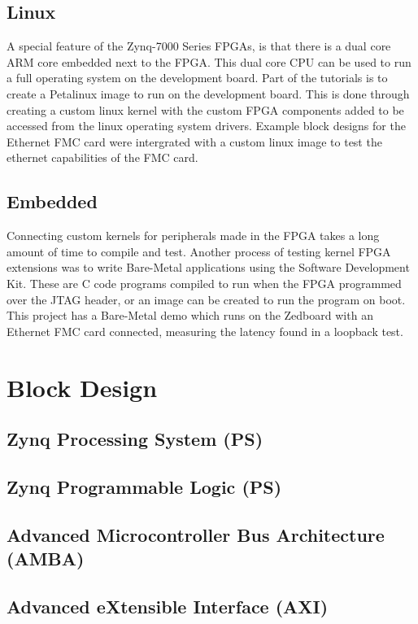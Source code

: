 \subsection{Linux}

\par A special feature of the Zynq-7000 Series FPGAs, is that there is a dual core ARM core embedded next to the FPGA.
This dual core CPU can be used to run a full operating system on the development board. Part of the tutorials is 
to create a Petalinux image to run on the development board. This is done through creating a custom linux kernel with
the custom FPGA components added to be accessed from the linux operating system drivers. Example block designs
for the Ethernet FMC card were intergrated with a custom linux image to test the ethernet capabilities of the FMC 
card.

\subsection{Embedded}

\par Connecting custom kernels for peripherals made in the FPGA takes a long amount of time to compile and test. 
Another process of testing kernel FPGA extensions was to write Bare-Metal applications using the Software 
Development Kit. These are C code programs compiled to run when the FPGA programmed over the JTAG header, or an 
image can be created to run the program on boot. This project has a Bare-Metal demo which runs on the Zedboard 
with an Ethernet FMC card connected, measuring the latency found in a loopback test. 

\section{Block Design}

\subsection{Zynq Processing System (PS)}
\subsection{Zynq Programmable Logic (PS)}
\subsection{Advanced Microcontroller Bus Architecture (AMBA)}
\subsection{Advanced eXtensible Interface (AXI)}
